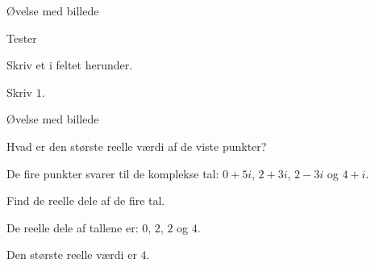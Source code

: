 \documentclass{article}
\begin{document}

\tableofcontents
\newpage

\begin{exercise}{Øvelse med billede}



Tester

Skriv et i feltet herunder.



\hint
Skriv $1$.
\end{exercise}



\begin{exercise}{Øvelse med billede}


Hvad er den største reelle værdi af de viste punkter?


\hint
De fire punkter svarer til de komplekse tal: 
$0 + 5i$, $2 + 3i$, $2 - 3i$ og $4 + i$.

\hint
Find de reelle dele af de fire tal.

\hint
De reelle dele af tallene er:
$0$, $2$, $2$ og $4$.

\hint
Den største reelle værdi er $4$.
\end{exercise}
\end{document}
